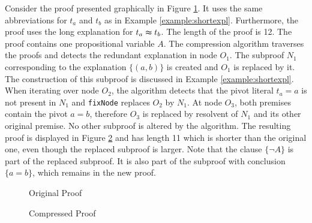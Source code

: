\begin{example}
\label{example:compressproof}
Consider the proof presented graphically in Figure \ref{fig:compressproof}.
It uses the same abbreviations for $t_a$ and $t_b$ as in Example \ref{example:shortexpl}.
Furthermore, the proof uses the long explanation for $t_a \thickapprox t_b$.
The length of the proof is 12.
The proof contains one propositional variable $A$.
The compression algorithm traverses the proofs and detects the redundant explanation in node $O_1$.
The subproof $N_1$ corresponding to the explanation $\{(a,b)\}$ is created and $O_1$ is replaced by it.
The construction of this subproof is discussed in Example \ref{example:shortexpl}.
When iterating over node $O_2$, the algorithm detects that the pivot literal $t_a = a$ is not present in $N_1$ and \texttt{fixNode} replaces $O_2$ by $N_1$.
At node $O_3$, both premises contain the pivot $a = b$, therefore $O_3$ is replaced by resolvent of $N_1$ and its other original premise.
No other subproof is altered by the algorithm.
The resulting proof is displayed in Figure \ref{fig:compressproof_2} and has length 11 which is shorter than the original one, even though the replaced subproof is larger.
Note that the clause $\{\neg A\}$ is part of the replaced subproof.
It is also part of the subproof with conclusion $\{a = b\}$, which remains in the new proof.

\begin{figure}[!h]

\caption{Original Proof}
\label{fig:compressproof}
\end{figure}

\begin{figure}[!h]

\caption{Compressed Proof}
\label{fig:compressproof_2}
\end{figure}

\end{example}

\FloatBarrier
